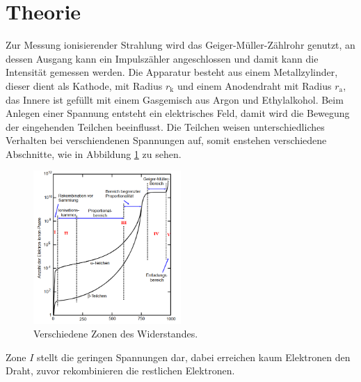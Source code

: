 \section{Theorie}
\label{sec:Theorie}
Zur Messung ionisierender Strahlung wird das Geiger-Müller-Zählrohr genutzt, an dessen Ausgang kann ein
Impulszähler angeschlossen und damit kann die Intensität gemessen werden.
Die Apparatur besteht aus einem Metallzylinder, dieser dient als Kathode, mit Radius $r_\mathrm{k}$ und
einem Anodendraht mit Radius $r_\mathrm{a}$, das Innere ist gefüllt mit einem Gasgemisch aus Argon und Ethylalkohol.
Beim Anlegen einer Spannung entsteht ein elektrisches Feld, damit wird die Bewegung der eingehenden Teilchen beeinflusst.
Die Teilchen weisen unterschiedliches Verhalten bei verschiendenen Spannungen auf, somit enstehen verschiedene Abschnitte, wie
in Abbildung \ref{fig:bereich} zu sehen.
\begin{figure}
  \centering
  \includegraphics[width=0.5\textwidth]{bereiche.PNG}
  \caption{Verschiedene Zonen des Widerstandes.}
  \label{fig:bereich}
\end{figure}
Zone $I$ stellt die geringen Spannungen dar, dabei erreichen kaum Elektronen den Draht, zuvor rekombinieren die restlichen Elektronen.
